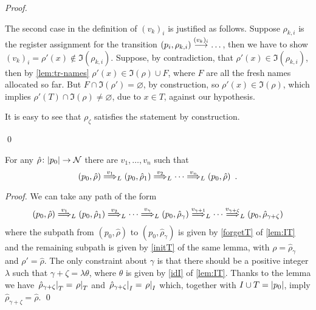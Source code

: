 \begin{proof}
\begin{enumerate}
The second case in the definition of $(v_k)_i$ is justified as follows. Suppose $\rho_{k,i}$ is the register assignment for the transition $(p_i,\rho_{k,i}) \overset{(v_k)_i}{\longrightarrow} \dots$, then we have to show $(v_k)_i = \rho'(x) \notin \Im(\rho_{k,i})$. Suppose, by contradiction, that $\rho'(x) \in \Im(\rho_{k,i})$, then by \cref{lem:tr-names} $\rho'(x) \in \Im(\rho) \cup F$, where $F$ are all the fresh names allocated so far. But $F \cap \Im(\rho') = \varnothing$, by construction, so $\rho'(x) \in \Im(\rho)$, which implies $\rho'(T) \cap \Im(\rho) \neq \varnothing$, due to $x \in T$, against our hypothesis.

It is easy to see that $\rho_\zeta$ satisfies the statement by construction.

\end{enumerate}
\qed
\end{proof}


\newcommand{\rrho}{\hat \rho}
\begin{proposition}
\label{prop:loop}

For any $\hat{\rho} \colon |p_0| \to \mathcal{N}$ there are $v_1,\dots,v_n$ such that
\[
	(p_0, \rrho) \TrP{v_1}{L} (p_0, \rrho_1) \TrP{v_2}{L} \cdots \TrP{v_n}{L} (p_0,\rrho) \enspace .
\]
\end{proposition}

\begin{proof}
We can take any path of the form
\[
	(p_0,\rrho) \TrP{v_1}{L} (p_0,\rrho_1) \TrP{v_2}{L} \cdots \TrP{v_{\gamma}}{L} (p_0,\rrho_\gamma) \TrP{v_{\gamma+1}}{L} \cdots \TrP{v_{\gamma + \zeta}}{L} (p_0,\rrho_{\gamma + 
	 \zeta})
\]
where the subpath from $(p_0,\rrho)$ to $(p_0,\rrho_\gamma)$ is given by \ref{forgetT} of \cref{lem:IT} and the remaining subpath is given by \ref{initT} of the same lemma, with $\rho = \rrho_\gamma$ and $\rho' = \rrho$. The only constraint about $\gamma$ is that there should be a positive integer $\lambda$ such that $\gamma + \zeta = \lambda \theta$, where $\theta$ is given by \ref{idI} of \cref{lem:IT}. Thanks to the lemma we have $\restr{\rrho_{\gamma + \zeta}}{T} = \restr{\rho}{T}$ and 
$\restr{\rrho_{\gamma + \zeta}}{I} = \restr{\rho}{I}$ which, together with $I \cup T = |p_0|$, imply $\rrho_{\gamma + \zeta} = \rrho$.
\qed
\end{proof}


